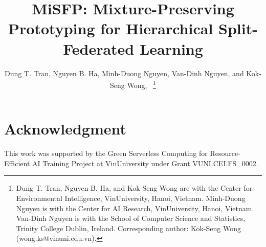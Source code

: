 \documentclass[journal]{IEEEtai}
\title{MiSFP: Mixture-Preserving Prototyping for Hierarchical Split-Federated Learning}
\author{Dung T. Tran, Nguyen B. Ha, Minh-Duong Nguyen, Van-Dinh Nguyen, and Kok-Seng Wong,~\IEEEmembership{Member, IEEE}%
\thanks{Dung T. Tran, Nguyen B. Ha, and Kok-Seng Wong are with the Center for Environmental Intelligence, VinUniversity, Hanoi, Vietnam. Minh-Duong Nguyen is with the Center for AI Research, VinUniversity, Hanoi, Vietnam. Van-Dinh Nguyen is with the School of Computer Science and Statistics, Trinity College Dublin, Ireland. Corresponding author: Kok-Seng Wong (wong.ks@vinuni.edu.vn).}}
\begin{document}
\maketitle









\appendices

\section*{Acknowledgment}
This work was supported by the Green Serverless Computing for Resource-Efficient AI Training Project at VinUniversity under Grant VUNI.CEI.FS\_0002.


\end{document}
